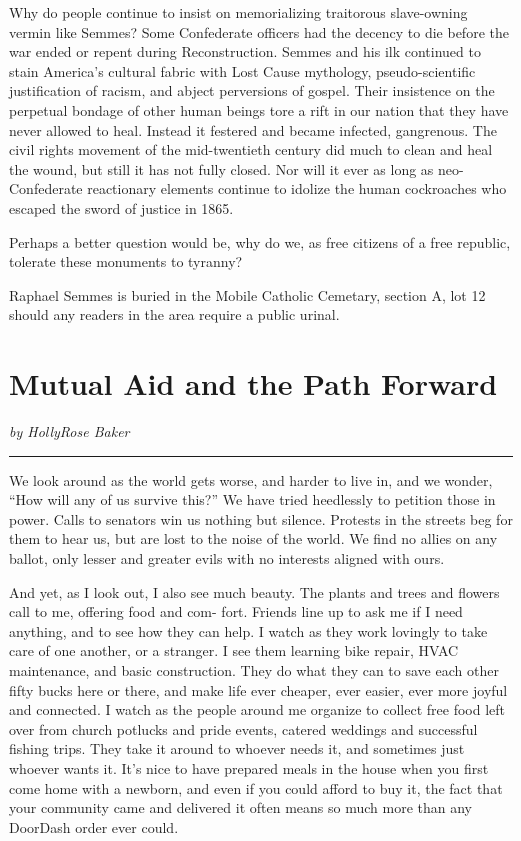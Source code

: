 \documentclass[
]{book}
\begin{document}
Why do people continue to insist on memorializing traitorous slave-owning vermin like Semmes? Some Confederate officers had the decency to die before the war ended or repent during Reconstruction. Semmes and his ilk continued to stain America's cultural fabric with Lost Cause mythology, pseudo-scientific justification of racism, and abject perversions of gospel. Their insistence on the perpetual bondage of other human beings tore a rift in our nation that they have never allowed to heal. Instead it festered and became infected, gangrenous. The civil rights movement of the mid-twentieth century did much to clean and heal the wound, but still it has not fully closed. Nor will it ever as long as neo-Confederate reactionary elements continue to idolize the human cockroaches who escaped the sword of justice in 1865.

Perhaps a better question would be, why do we, as free citizens of a free republic, tolerate these monuments to tyranny?

Raphael Semmes is buried in the Mobile Catholic Cemetary, section A, lot 12 should any readers in the area require a public urinal.

\section*{Mutual Aid and the Path Forward}\label{mutual-aid-and-the-path-forward}

\emph{by HollyRose Baker}

\begin{center}\rule{0.5\linewidth}{0.5pt}\end{center}

We look around as the world gets worse, and harder to live in, and we wonder, ``How will any of us survive this?'' We have tried heedlessly to petition those in power. Calls to senators win us nothing but silence. Protests in the streets beg for them to hear us, but are lost to the noise of the world. We find no allies on any ballot, only lesser and greater evils with no interests aligned with ours.

And yet, as I look out, I also see much beauty. The plants and trees and flowers call to me, offering food and com- fort. Friends line up to ask me if I need anything, and to see how they can help. I watch as they work lovingly to take care of one another, or a stranger. I see them learning bike repair, HVAC maintenance, and basic construction. They do what they can to save each other fifty bucks here or there, and make life ever cheaper, ever easier, ever more joyful and connected. I watch as the people around me organize to collect free food left over from church potlucks and pride events, catered weddings and successful fishing trips. They take it around to whoever needs it, and sometimes just whoever wants it. It's nice to have prepared meals in the house when you first come home with a newborn, and even if you could afford to buy it, the fact that your community came and delivered it often means so much more than any DoorDash order ever could.
\end{document}
